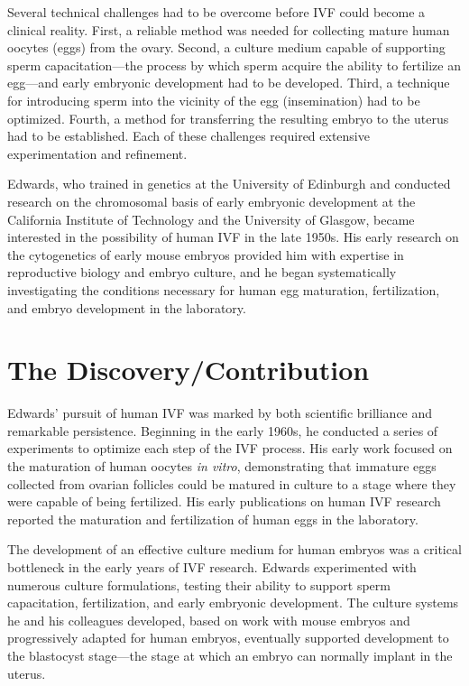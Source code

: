 Several technical challenges had to be overcome before IVF could become a clinical reality. First, a reliable method was needed for collecting mature human oocytes (eggs) from the ovary. Second, a culture medium capable of supporting sperm capacitation---the process by which sperm acquire the ability to fertilize an egg---and early embryonic development had to be developed. Third, a technique for introducing sperm into the vicinity of the egg (insemination) had to be optimized. Fourth, a method for transferring the resulting embryo to the uterus had to be established. Each of these challenges required extensive experimentation and refinement.

Edwards, who trained in genetics at the University of Edinburgh and conducted research on the chromosomal basis of early embryonic development at the California Institute of Technology and the University of Glasgow, became interested in the possibility of human IVF in the late 1950s. His early research on the cytogenetics of early mouse embryos provided him with expertise in reproductive biology and embryo culture, and he began systematically investigating the conditions necessary for human egg maturation, fertilization, and embryo development in the laboratory.

\section{The Discovery/Contribution}

Edwards' pursuit of human IVF was marked by both scientific brilliance and remarkable persistence. Beginning in the early 1960s, he conducted a series of experiments to optimize each step of the IVF process. His early work focused on the maturation of human oocytes \textit{in vitro}, demonstrating that immature eggs collected from ovarian follicles could be matured in culture to a stage where they were capable of being fertilized. His early publications on human IVF research reported the maturation and fertilization of human eggs in the laboratory.

The development of an effective culture medium for human embryos was a critical bottleneck in the early years of IVF research. Edwards experimented with numerous culture formulations, testing their ability to support sperm capacitation, fertilization, and early embryonic development. The culture systems he and his colleagues developed, based on work with mouse embryos and progressively adapted for human embryos, eventually supported development to the blastocyst stage---the stage at which an embryo can normally implant in the uterus.

